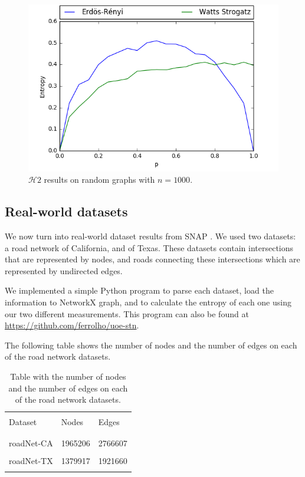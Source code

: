 \documentclass[journal]{IEEEtran}
\begin{document}
\begin{figure}[ht]
    \centering
    \includegraphics[width=\linewidth]{res/entropy2/experiment_n1000.png}
    \caption{$\mathcal{H}2$ results on random graphs with $n = 1000$.}
\end{figure}

\subsection{Real-world datasets}

We now turn into real-world dataset results from SNAP \cite{snapnets}. We used two datasets: a road network of California, and of Texas. These datasets contain intersections that are represented by nodes, and roads connecting these intersections which are represented by undirected edges.

\bigskip

We implemented a simple Python program to parse each dataset, load the information to  NetworkX graph, and to calculate the entropy of each one using our two different measurements. This program can also be found at \url{https://github.com/ferrolho/uoe-stn}.

\bigskip

The following table shows the number of nodes and the number of edges on each of the road network datasets.

\bigskip

\begin{table}[ht]
    \centering
	\begin{tabu} to 0.45\textwidth{ | X[c] | X[c] | X[c] | }
		\hline
		& & \\
		Dataset & Nodes & Edges \\
		& & \\
		\hline
		& & \\
		roadNet-CA & 1965206 & 2766607 \\
		& & \\
		roadNet-TX & 1379917 & 1921660 \\
		& & \\
		\hline
	\end{tabu}
	\medskip
    \caption{Table with the number of nodes and the number of edges on each of the road network datasets.}
\end{table}
\end{document}
